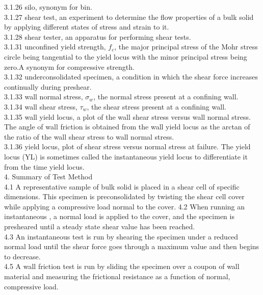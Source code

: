 3.1.26 silo, synonym for bin. \\
3.1.27 shear test, an experiment to determine the flow properties of a bulk solid by applying different states of stress and strain to it. \\
3.1.28 shear tester, an apparatus for performing shear tests. \\
3.1.31 unconfined yield strength, $f_c$, the major principal stress of the Mohr stress circle being tangential to the yield locus with the minor principal stress being zero.A synonym for compressive strength. \\
3.1.32 underconsolidated specimen, a condition in which the shear force increases continually during preshear. \\
3.1.33 wall normal stress, $\sigma_w$, the normal stress present at a confining wall. \\
3.1.34 wall shear stress, $\tau_w$, the shear stress present at a confining wall. \\
3.1.35 wall yield locus,  a plot of the wall shear stress versus wall normal stress. The angle of wall friction is obtained from the wall yield locus as the arctan of the ratio of the wall shear stress to wall normal stress. \\
3.1.36 yield locus, plot of shear stress versus normal stress at failure. The yield locus (YL) is sometimes called the instantaneous yield locus to differentiate it from the time yield locus. \\
 
4. Summary of Test Method \\
4.1 A representative sample of bulk solid is placed in a shear cell of specific dimensions. This specimen is preconsolidated by twisting the shear cell cover while applying a compressive load normal to the cover.
4.2 When running an instantaneous
, a normal load is applied to the cover, and the specimen is presheared until a steady state shear value has been reached. \\
4.3 An instantaneous test is run by shearing the specimen under a reduced normal load until the shear force goes through a maximum value and then begins to decrease. \\
4.5 A wall friction test is run by sliding the specimen over a coupon of wall material and measuring the frictional resistance as a function of normal, compressive load. \\


